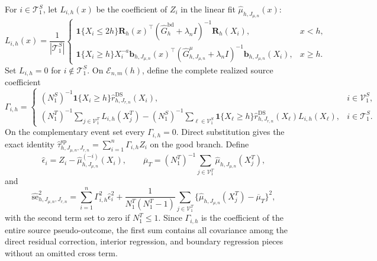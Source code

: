 For \(i\in\mathcal T^S_1\), let \(L_{i,h}(x)\) be the coefficient of \(Z_i\) in the linear fit \(\widehat\mu_{h,J_{\mu,n}}(x)\):
\[
 L_{i,h}(x)=\frac1{|\mathcal T^S_1|}
 \begin{cases}
 \mathbf 1\{X_i\le2h\}\mathbf R_h(x)^\top
 (\widehat G^{\mathrm{bd}}_h+\lambda_nI)^{-1}\mathbf R_h(X_i),&x<h,\\
 \mathbf 1\{X_i\ge h\}X_i^{-a}\mathbf b_{h,J_{\mu,n}}(x)^\top
 (\widehat G^{\mu}_{h,J_{\mu,n}}+\lambda_nI)^{-1}
 \mathbf b_{h,J_{\mu,n}}(X_i),&x\ge h.
 \end{cases}
\]
Set \(L_{i,h}=0\) for \(i\notin\mathcal T^S_1\).  On \(\mathcal E_{n,m}(h)\), define the complete realized source coefficient
\[
 \Gamma_{i,h}=\begin{cases}
 (N^S_1)^{-1}\mathbf 1\{X_i\ge h\}\widehat r^{\mathrm{DS}}_{h,J_{r,n}}(X_i),&i\in\mathcal V^S_1,\\
 (N^T_1)^{-1}\displaystyle\sum_{j\in\mathcal V^T_1}L_{i,h}(X_j^T)
 -(N^S_1)^{-1}\displaystyle\sum_{\ell\in\mathcal V^S_1}
 \mathbf 1\{X_\ell\ge h\}\widehat r^{\mathrm{DS}}_{h,J_{r,n}}(X_\ell)L_{i,h}(X_\ell),&i\in\mathcal T^S_1.
 \end{cases}
\]
On the complementary event set every \(\Gamma_{i,h}=0\).  Direct substitution gives the exact identity \(\widehat\tau^{\mathrm{sp}}_{h,J_{\mu,n},J_{r,n}}=\sum_{i=1}^n\Gamma_{i,h}Z_i\) on the good branch.  Define
\[
 \widehat\epsilon_i=Z_i-\widehat\mu^{(-i)}_{h,J_{\mu,n}}(X_i),
 \qquad
 \overline\mu_T=(N^T_1)^{-1}\sum_{j\in\mathcal V^T_1}
 \widehat\mu_{h,J_{\mu,n}}(X_j^T),
\]
and
\[
 \widehat{\mathrm{se}}_{h,J_{\mu,n},J_{r,n}}^2
 =\sum_{i=1}^n\Gamma_{i,h}^2\widehat\epsilon_i^2
 +\frac1{N^T_1(N^T_1-1)}\sum_{j\in\mathcal V^T_1}
 \{\widehat\mu_{h,J_{\mu,n}}(X_j^T)-\overline\mu_T\}^2,
\]
with the second term set to zero if \(N^T_1\le1\).  Since \(\Gamma_{i,h}\) is the coefficient of the entire source pseudo-outcome, the first sum contains all covariance among the direct residual correction, interior regression, and boundary regression pieces without an omitted cross term.